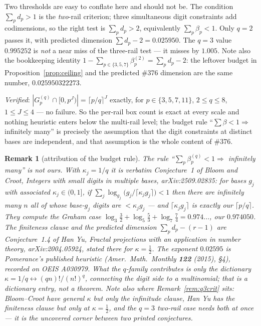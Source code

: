\documentclass[11pt]{article}
\newtheorem{remark}[theorem]{Remark}
\begin{document}
Two thresholds are easy to conflate here and should not be.  The condition $\sum_p d_p>1$ is
the \emph{two}-rail criterion; three simultaneous digit constraints add codimensions, so the
right test is $\sum_p d_p>2$, equivalently $\sum_p\beta_p<1$.  Only $q=2$ passes it, with
predicted dimension $\sum d_p-2=0.025950$.  The $q=3$ value $0.995252$ is \emph{not} a near
miss of the three-rail test --- it misses by $1.005$.  Note also the bookkeeping identity
$1-\sum_{p\in\{3,5,7\}}\beta_p^{(2)}=\sum_p d_p-2$: the leftover budget in
Proposition~\ref{prop:ceiling} and the predicted \#376 dimension are the same number,
$0.025950322273$.

\emph{Verified}: $|G_p^{(q)}\cap[0,p^{J})|=\lceil p/q\rceil^{J}$ exactly, for
$p\in\{3,5,7,11\}$, $2\le q\le8$, $1\le J\le4$ --- no failure.  So the per-rail box count is
exact at every scale and nothing heuristic enters below the multi-rail level; the budget rule
``$\sum\beta<1\Rightarrow$ infinitely many'' is precisely the assumption that the digit
constraints at distinct bases are independent, and that assumption is the whole content of
\#376.

\begin{remark}[attribution of the budget rule]\label{rem:attrib}
The rule ``$\sum_p\beta_p^{(q)}<1\Rightarrow$ infinitely many'' is not ours.  With
$\kappa_j=1/q$ it is verbatim Conjecture~1 of Bloom and Croot, \emph{Integers with small digits
in multiple bases}, arXiv:2509.02835: for bases $g_j$ with associated $\kappa_j\in(0,1]$,
if $\sum_j\log_{g_j}\bigl(g_j/\lceil\kappa_jg_j\rceil\bigr)<1$ then there are infinitely many
$n$ all of whose base-$g_j$ digits are $<\kappa_jg_j$ --- and $\lceil\kappa_jg_j\rceil$ is
exactly our $\lceil p/q\rceil$.  They compute the Graham case
$\log_3\tfrac32+\log_5\tfrac53+\log_7\tfrac74=0.974\dots$, our $0.974050$.  The finiteness
clause and the predicted dimension $\sum_pd_p-(r-1)$ are Conjecture~1.4 of Han Yu,
\emph{Fractal projections with an application in number theory}, arXiv:2004.05924, stated there
for $\kappa=\tfrac12$.  The exponent $0.02595$ is Pomerance's published heuristic (Amer.\ Math.\
Monthly \textbf{122} (2015), \S4), recorded on OEIS A030979.  What the $q$-family contributes is
only the dictionary $\kappa=1/q\leftrightarrow(qn)!/(n!)^{q}$, connecting the digit side to a
multinomial; that is a dictionary entry, not a theorem.  Note also where
Remark~\ref{rem:q3crit} sits: Bloom--Croot have general $\kappa$ but only the infinitude
clause, Han Yu has the finiteness clause but only at $\kappa=\tfrac12$, and the $q=3$ two-rail
case needs both at once --- it is the uncovered corner between two printed conjectures.
\end{remark}
\end{document}
